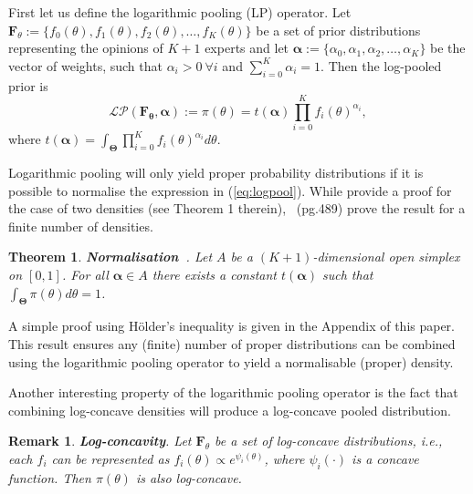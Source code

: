 \documentclass[a4paper, notitlepage, 10pt]{article}
\newtheorem{theo}{Theorem}[]
\newtheorem{remark}{Remark}[]
\begin{document}
First let us define the logarithmic pooling (LP) operator.
Let $\mathbf{F}_{\theta} := \{f_0(\theta), f_1(\theta), f_2(\theta), \ldots, f_K(\theta)\}$ be a set of prior distributions representing the opinions of $K+1$ experts and let $\boldsymbol\alpha :=\{\alpha_0, \alpha_1, \alpha_2, \ldots, \alpha_K \}$ be the vector of weights, such that $\alpha_i > 0\: \forall i$ and $\sum_{i=0}^K \alpha_i = 1$.
Then the log-pooled prior is
\begin{equation}
\label{eq:logpool}
 \mathcal{LP}(\mathbf{F_\theta}, \boldsymbol\alpha) := \pi(\theta) = t(\boldsymbol\alpha) \prod_{i=0}^K f_i(\theta)^{\alpha_i},
\end{equation}
where $t(\boldsymbol\alpha) = \int_{\boldsymbol\Theta}\prod_{i=0}^K f_i(\theta)^{\alpha_i}d\theta$.

Logarithmic pooling will only yield proper probability distributions if it is possible to normalise the expression in (\ref{eq:logpool}).
While \citet{poole2000} provide a proof for the case of two densities (see Theorem 1 therein),~\cite{genest1986A} (pg.489) prove the result for a finite number of densities.
\begin{theo}
\label{thm:normalisation}
\textbf{Normalisation~\citep{genest1986A}}. 
Let $A$ be a $(K+1)$-dimensional open simplex on $[0,1]$.
For all $\boldsymbol\alpha \in A$ there exists a constant $t(\boldsymbol\alpha)$ such that $\int_{\boldsymbol\Theta}\pi(\theta)d\theta = 1$.
\end{theo}
A simple proof using H\"{o}lder's inequality is given in the Appendix of this paper.
This result ensures any (finite) number of proper distributions can be combined using the logarithmic pooling operator to yield a normalisable (proper) density.

Another interesting property of the logarithmic pooling operator is the fact that combining log-concave densities will produce a log-concave pooled distribution.
\begin{remark}
\label{rmk:concavity}
\textbf{Log-concavity}. 
 Let $\mathbf{F}_{\theta}$ be a set of log-concave distributions, i.e., each $f_i$ can be represented as $ f_i(\theta) \propto e^{\psi_i(\theta)}$,
where $\psi_i(\cdot)$ is a concave function.
Then $\pi(\theta)$ is also log-concave.
\end{remark}
\end{document}

